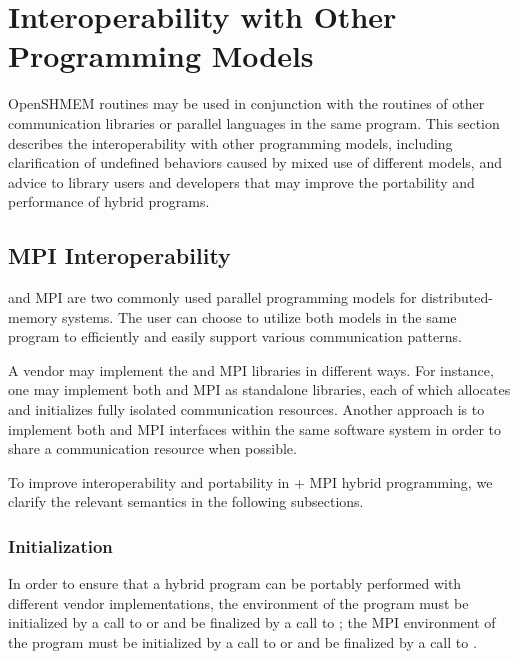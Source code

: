 \chapter{Interoperability with Other Programming Models}\label{sec:interoperability}

OpenSHMEM routines may be used in conjunction with the routines of other
communication libraries or parallel languages in the same program. This section
describes the interoperability with other programming models, including
clarification of undefined behaviors caused by mixed use of different models,
and advice to \openshmem library users and developers that may improve the portability
and performance of hybrid programs.


\section{MPI Interoperability}

\openshmem and \ac{MPI} are two commonly used parallel programming models for
distributed-memory systems. The user can choose to utilize both models in the same program
to efficiently and easily support various communication patterns.

A vendor may implement the \openshmem and \ac{MPI} libraries in different ways. For
instance, one may implement both \openshmem and \ac{MPI} as standalone libraries,
each of which allocates and initializes fully isolated communication
resources.
Another approach
is to implement both \openshmem and \ac{MPI} interfaces within the
same software system in order to share a communication resource when possible.

To improve interoperability and portability in \openshmem + \ac{MPI} hybrid
programming, we clarify the relevant semantics in the following subsections.


\subsection{Initialization}
In order to ensure that a hybrid program can be portably performed with different vendor
implementations, the \openshmem environment of the program must be initialized by
a call to  or  and be finalized by
a call to ; the \ac{MPI} environment of the program must be initialized
by a call to  or  and be finalized by a
call to .



